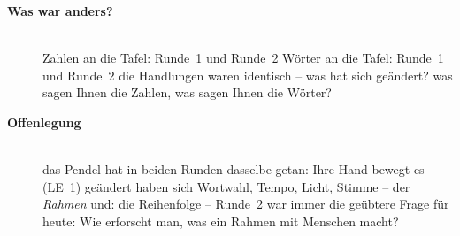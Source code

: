 \begin{description}
\item[{\rot\bf Was war anders?}]~\\[-\lblskip]
\bi
  \ite Zahlen an die Tafel: Runde~1 und Runde~2
  \ite Wörter an die Tafel: Runde~1 und Runde~2
  \ite die Handlungen waren identisch -- was hat sich geändert?
  \ite was sagen Ihnen die Zahlen, was sagen Ihnen die Wörter?
\ei
{}
\os{\newpage}

\item[{\rot\bf Offenlegung}]~\\[-\lblskip]
\bi
  \ite das Pendel hat in beiden Runden dasselbe getan: Ihre Hand bewegt
    es (LE~1)
  \ite geändert haben sich Wortwahl, Tempo, Licht, Stimme -- der
    \emph{Rahmen}
  \ite und: die Reihenfolge -- Runde~2 war immer die geübtere
  \ite Frage für heute: Wie erforscht man, was ein Rahmen mit Menschen
    macht?
\ei
\os{\newpage}
\end{description}

